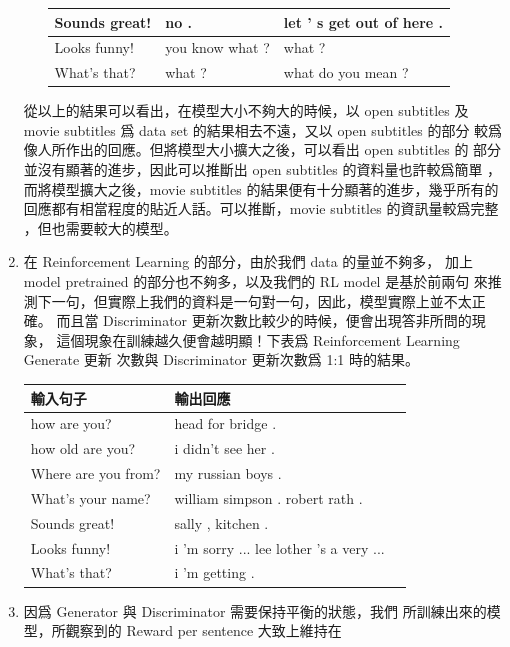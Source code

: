 \documentclass[12pt, a4paper]{article}
\theoremstyle{mystyle}	%
\begin{document}
\begin{enumerate}
\begin{enumerate}
\begin{tabular}{lll}
      \hline
      Sounds great!       & no .                      & let ' s get out of here . \\
      \hline
      Looks funny!        & you know what ?           & what ? \\
      \hline
      What's that?        & what ?                    & what do you mean ? \\
      \hline
    \end{tabular}
  \end{enumerate}
  從以上的結果可以看出，在模型大小不夠大的時候，以 open subtitles 及
  movie subtitles 爲 data set 的結果相去不遠，又以 open subtitles 的部分
  較爲像人所作出的回應。但將模型大小擴大之後，可以看出 open subtitles 的
  部分並沒有顯著的進步，因此可以推斷出 open subtitles 的資料量也許較爲簡單
  ，而將模型擴大之後，movie subtitles 的結果便有十分顯著的進步，幾乎所有的
  回應都有相當程度的貼近人話。可以推斷，movie subtitles 的資訊量較爲完整
  ，但也需要較大的模型。
\item 在 Reinforcement Learning 的部分，由於我們 data 的量並不夠多，
  加上 model pretrained 的部分也不夠多，以及我們的 RL model 是基於前兩句
  來推測下一句，但實際上我們的資料是一句對一句，因此，模型實際上並不太正確。
  而且當 Discriminator 更新次數比較少的時候，便會出現答非所問的現象，
  這個現象在訓練越久便會越明顯！下表爲 Reinforcement Learning Generate 更新
  次數與 Discriminator 更新次數爲 1:1 時的結果。 \\
  \begin{tabular}{lll}
    \hline
    輸入句子            & 輸出回應        \\
    \hline
    \hline
    how are you?        & head for bridge .          \\
    \hline
    how old are you?    & i didn't see her .         \\
    \hline
    Where are you from? & my russian boys .          \\
    \hline
    What's your name?   & william simpson . robert rath . \\
    \hline
    Sounds great!       & sally , kitchen .            \\
    \hline
    Looks funny!        & i 'm sorry ... lee lother 's a very ...     \\
    \hline
    What's that?        & i 'm getting . \\
    \hline
  \end{tabular}
\item 因爲 Generator 與 Discriminator 需要保持平衡的狀態，我們
  所訓練出來的模型，所觀察到的 Reward per sentence 大致上維持在

\end{enumerate}
\end{document}
